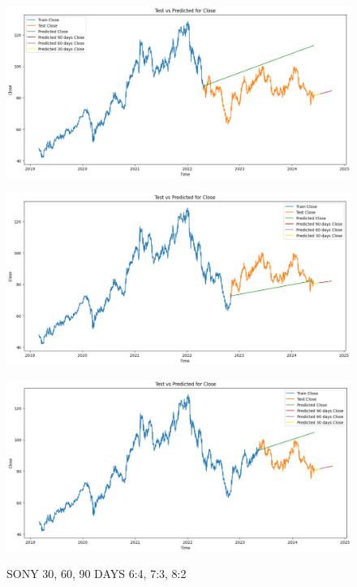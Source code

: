 \documentclass[conference]{IEEEtran}
\begin{document}
\begin{figure}[H]
    \centering
    \begin{minipage}{0.15\textwidth}
    \centering
    \includegraphics[width=1\textwidth]{Image/VARMA/SONY/6_4.png}
   
    \label{fig:1}
    \end{minipage}%
    \begin{minipage}{0.15\textwidth}
    \centering
    \includegraphics[width=1\textwidth]{Image/VARMA/SONY/7_3.png}
  
    \label{fig:2}
    \end{minipage}%
    \begin{minipage}{0.15\textwidth}
    \centering
    \includegraphics[width=1\textwidth]{Image/VARMA/SONY/8_2.png}

    \label{fig:3}
    \end{minipage}
    \caption{ SONY 30, 60, 90 DAYS  6:4, 7:3, 8:2 }
\end{figure}
\end{document}

